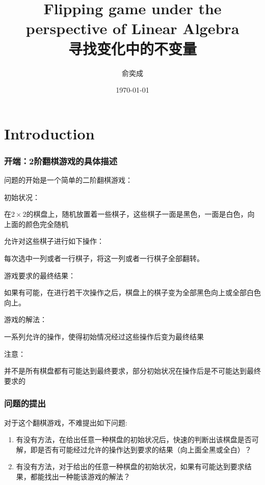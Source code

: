 \documentclass[UTF-8,a4paper]{ctexart}
\begin{document}
\title{Flipping game under the perspective of Linear Algebra\\寻找变化中的不变量}
\author{\kaishu 俞奕成}
\date{\kaishu \today}
\maketitle
\setcounter{tocdepth}{2}
\tableofcontents
\newpage

\part{Introduction}
\section{开端：2阶翻棋游戏的具体描述}
问题的开始是一个简单的二阶翻棋游戏：\par
初始状况：\par
\kaishu 在\(2 \times 2\)的棋盘上，随机放置着一些棋子，这些棋子一面是黑色，一面是白色，向上面的颜色完全随机 \par
\songti 允许对这些棋子进行如下操作：\par
\kaishu 每次选中一列或者一行棋子，将这一列或者一行棋子全部翻转。\par
\songti 游戏要求的最终结果：\par
\kaishu 如果有可能，在进行若干次操作之后，棋盘上的棋子变为全部黑色向上或全部白色向上。\par
\songti 游戏的解法：\par
\kaishu 一系列允许的操作，使得初始情况经过这些操作后变为最终结果 \par
\songti 注意：\par
\kaishu 并不是所有棋盘都有可能达到最终要求，部分初始状况在操作后是不可能达到最终要求的
\section{问题的提出}
\songti 对于这个翻棋游戏，不难提出如下问题:
\kaishu
\begin{enumerate}
    \item 有没有方法，在给出任意一种棋盘的初始状况后，快速的判断出该棋盘是否可解，即是否有可能经过允许的操作达到要求的结果（向上面全黑或全白）？
    \item 有没有方法，对于给出的任意一种棋盘的初始状况，如果有可能达到要求结果，都能找出一种能该游戏的解法？
\end{enumerate}
\end{document}
